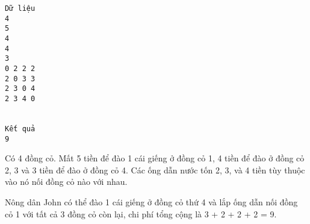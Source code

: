 \begin{verbatim}
Dữ liệu
4
5
4
4
3
0 2 2 2
2 0 3 3
2 3 0 4
2 3 4 0


Kết quả
9
\end{verbatim}
Có 4 đồng cỏ. Mất 5 tiền để đào 1 cái giếng ở đồng cỏ 1, 4 tiền để đào ở đồng cỏ 2, 3 và 3 tiền để đào ở đồng cỏ 4. Các ống dẫn nước tốn 2, 3, và 4 tiền tùy thuộc vào nó nối đồng cỏ nào với nhau.  

   Nông dân John có thể đào 1 cái giếng ở đồng cỏ thứ 4 và lắp ống dẫn  nối đồng cỏ 1 với tất cả 3 đồng cỏ còn lại, chi phí tổng cộng là 3 + 2 + 2 + 2 = 9.
